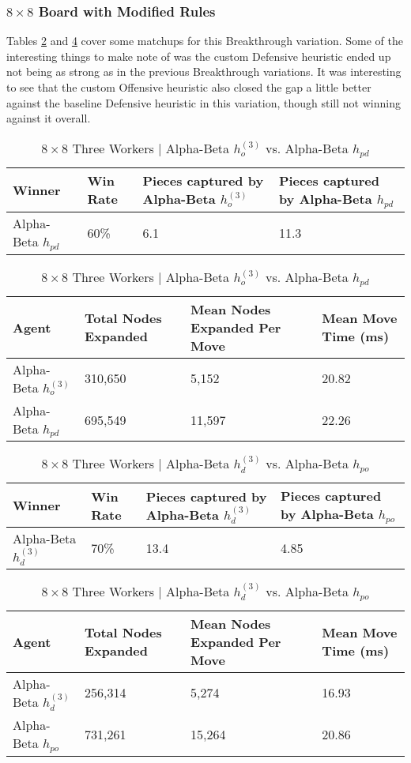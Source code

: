 \documentclass{article}[12pt]
\begin{document}
	\subsubsection{$8 \times 8$ Board with Modified Rules}
	Tables \ref{tab:t32} and \ref{tab:t33} cover some matchups for this Breakthrough variation. Some of the interesting things to make note of was the custom Defensive heuristic ended up not being as strong as in the previous Breakthrough variations. It was interesting to see that the custom Offensive heuristic also closed the gap a little better against the baseline Defensive heuristic in this variation, though still not winning against it overall. 
   
   \begin{table}[ht]
   	\centering
   	\begin{tabular}{l | l | l | l}
   		\hline
   		Winner & Win Rate & Pieces captured by Alpha-Beta $h_{o}^{(3)}$ & Pieces captured by Alpha-Beta $h_{pd}$ \\
   		\hline \hline 
   		Alpha-Beta $h_{pd}$ & 60\% & 6.1 & 11.3 \\
   		\hline
   	\end{tabular}
   	
   	\vspace{10px}
   	
   	\begin{tabular}{l | l | l | l}
   		\hline
   		Agent & Total Nodes Expanded & Mean Nodes Expanded Per Move & Mean Move Time (ms) \\
   		\hline \hline 
   		Alpha-Beta $h_{o}^{(3)}$ & 310,650& 5,152& 20.82 \\
   		Alpha-Beta $h_{pd}$ &695,549 & 11,597 & 22.26\\
   		\hline
   	\end{tabular}
   	\caption{$8 \times8 $ Three Workers | Alpha-Beta $h_{o}^{(3)}$ vs. Alpha-Beta $h_{pd}$} \label{tab:t32}
   \end{table}

\begin{table}[ht]
	\centering
	\begin{tabular}{l | l | l | l}
		\hline
		Winner & Win Rate & Pieces captured by Alpha-Beta $h_{d}^{(3)}$ & Pieces captured by Alpha-Beta $h_{po}$ \\
		\hline \hline 
		Alpha-Beta $h_{d}^{(3)}$  & 70\% & 13.4 & 4.85 \\
		\hline
	\end{tabular}
	
	\vspace{10px}
	
	\begin{tabular}{l | l | l | l}
		\hline
		Agent & Total Nodes Expanded & Mean Nodes Expanded Per Move & Mean Move Time (ms) \\
		\hline \hline 
		Alpha-Beta $h_{d}^{(3)}$  & 256,314& 5,274 & 16.93 \\
		Alpha-Beta $h_{po}$ & 731,261 & 15,264 & 20.86\\
		\hline
	\end{tabular}
	\caption{$8 \times8 $ Three Workers | Alpha-Beta $h_{d}^{(3)}$ vs. Alpha-Beta $h_{po}$} \label{tab:t33}
\end{table}
\end{document}

